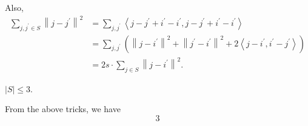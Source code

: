 Also,
\[
	\begin{split}
		\sum_{j, j^\prime \in S} \left\lVert j - j^\prime \right\rVert ^{2}
		&= \sum_{j, j^\prime }\left\langle j- j^\prime + i^\prime - i^\prime , j- j^\prime + i^\prime - i^\prime  \right\rangle  \\
		&= \sum_{j, j^\prime } \left( \left\lVert j - i^\prime \right\rVert^{2} + \left\lVert j^\prime - i^\prime \right\rVert ^{2} + 2 \left\langle j -i^\prime , i^\prime - j^\prime  \right\rangle   \right) \\
		&= 2s\cdot \sum_{j\in S} \left\lVert j - i^\prime \right\rVert ^{2} .
	\end{split}
\]

\begin{claim}
	\(\left\vert S \right\vert \leq 3\).
\end{claim}
\begin{explanation}
	From the above tricks, we have
	\[
		3
	\]
\end{explanation}